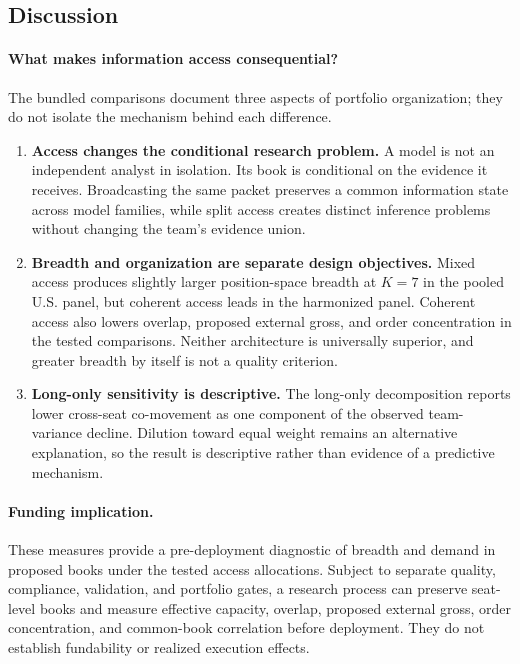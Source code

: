 \documentclass[sigconf]{acmart}
\begin{document}
\subsection{Discussion}
\paragraph{What makes information access consequential?}
The bundled comparisons document three aspects of portfolio organization; they do not isolate the mechanism behind each difference.
\begin{enumerate}[leftmargin=1.7em,label=\textbf{\arabic*.},itemsep=2pt,topsep=2pt,parsep=0pt]
\item \textbf{Access changes the conditional research problem.} A model is not an independent analyst in isolation. Its book is conditional on the evidence it receives. Broadcasting the same packet preserves a common information state across model families, while split access creates distinct inference problems without changing the team's evidence union.
\item \textbf{Breadth and organization are separate design objectives.} Mixed access produces slightly larger position-space breadth at $K=7$ in the pooled U.S. panel, but coherent access leads in the harmonized panel. Coherent access also lowers overlap, proposed external gross, and order concentration in the tested comparisons. Neither architecture is universally superior, and greater breadth by itself is not a quality criterion.
\item \textbf{Long-only sensitivity is descriptive.} The long-only decomposition reports lower cross-seat co-movement as one component of the observed team-variance decline. Dilution toward equal weight remains an alternative explanation, so the result is descriptive rather than evidence of a predictive mechanism.
\end{enumerate}

\paragraph{Funding implication.}
These measures provide a pre-deployment diagnostic of breadth and demand in proposed books under the tested access allocations. Subject to separate quality, compliance, validation, and portfolio gates, a research process can preserve seat-level books and measure effective capacity, overlap, proposed external gross, order concentration, and common-book correlation before deployment. They do not establish fundability or realized execution effects.
\end{document}
